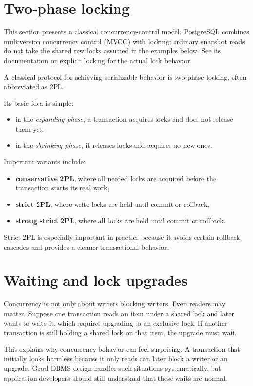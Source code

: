 \documentclass[11pt,a4paper,openany]{book}
\begin{document}
\section{Two-phase locking}
This section presents a classical concurrency-control model. PostgreSQL combines multiversion concurrency control (MVCC) with locking; ordinary snapshot reads do not take the shared row locks assumed in the examples below. See its documentation on \href{https://www.postgresql.org/docs/18/explicit-locking.html}{explicit locking} for the actual lock behavior.

A classical protocol for achieving serializable behavior is two-phase locking, often abbreviated as 2PL.

Its basic idea is simple:
\begin{itemize}
\item in the \emph{expanding phase}, a transaction acquires locks and does not release them yet,
\item in the \emph{shrinking phase}, it releases locks and acquires no new ones.
\end{itemize}

Important variants include:
\begin{itemize}
\item \textbf{conservative 2PL}, where all needed locks are acquired before the transaction starts its real work,
\item \textbf{strict 2PL}, where write locks are held until commit or rollback,
\item \textbf{strong strict 2PL}, where all locks are held until commit or rollback.
\end{itemize}

Strict 2PL is especially important in practice because it avoids certain rollback cascades and provides a cleaner transactional behavior.

\section{Waiting and lock upgrades}
Concurrency is not only about writers blocking writers. Even readers may matter. Suppose one transaction reads an item under a shared lock and later wants to write it, which requires upgrading to an exclusive lock. If another transaction is still holding a shared lock on that item, the upgrade must wait.

This explains why concurrency behavior can feel surprising. A transaction that initially looks harmless because it only reads can later block a writer or an upgrade. Good DBMS design handles such situations systematically, but application developers should still understand that these waits are normal.
\end{document}

